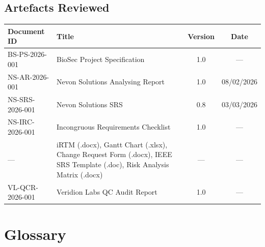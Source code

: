 \documentclass[11pt,a4paper]{article}
\begin{document}
\subsection{Artefacts Reviewed}

\begin{table}[H]
\centering\small
\begin{tabular}{|L{2.8cm}|>{\RaggedRight\arraybackslash}m{6cm}|c|c|}
\hline
{}
\textbf{Document ID} & \textbf{Title} & \textbf{Version} & \textbf{Date} \\\hline
BS-PS-2026-001 & BioSec Project Specification & 1.0 & --- \\\hline
NS-AR-2026-001 & Nevon Solutions Analysing Report & 1.0 & 08/02/2026 \\\hline
NS-SRS-2026-001 & Nevon Solutions SRS & 0.8 & 03/03/2026 \\\hline
NS-IRC-2026-001 & Incongruous Requirements Checklist & 1.0 & --- \\\hline
--- & iRTM (.docx), Gantt Chart (.xlsx), Change Request Form (.docx), IEEE SRS Template (.doc), Risk Analysis Matrix (.docx) & --- & --- \\\hline
VL-QCR-2026-001 & Veridion Labs QC Audit Report & 1.0 & --- \\\hline
\end{tabular}
\end{table}

\clearpage
\renewcommand{\appendixprefix}{E}
\setcounter{page}{1}
\section{Glossary}
\end{document}
